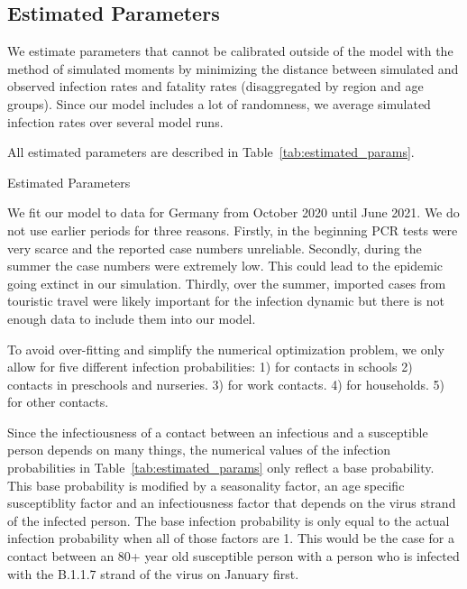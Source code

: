 \subsection{Estimated Parameters}
\label{subsec:estimated_params}


\FloatBarrier

We estimate parameters that cannot be calibrated outside of the model with the
method of simulated moments \citep{McFadden1989} by minimizing the distance between
simulated and observed infection rates and fatality rates (disaggregated by region
and age groups). Since our model includes a lot of randomness, we
average simulated infection rates over several model runs.

All estimated parameters are described in Table~\ref{tab:estimated_params}.

\begin{table}[htb]
    \centering
    \caption{Estimated Parameters}
    \label{tab:estimated_params}
    
\end{table}

We fit our model to data for Germany from October 2020 until June 2021. We do not use
earlier periods for three reasons. Firstly, in the beginning PCR tests were very scarce
and the reported case numbers unreliable. Secondly, during the summer the case
numbers were extremely low. This could lead to the epidemic going extinct in our
simulation. Thirdly, over the summer, imported cases from touristic travel were likely
important for the infection dynamic but there is not enough data to include them into
our model.

To avoid over-fitting and simplify the numerical optimization problem, we only allow for
five different infection probabilities: 1) for contacts in schools 2) contacts in
preschools and nurseries. 3) for work contacts. 4) for households. 5) for other
contacts.

Since the infectiousness of a contact between an infectious and a susceptible
person depends on many things, the numerical values of the infection probabilities in
Table~\ref{tab:estimated_params} only reflect a base probability. This
base probability is modified by a seasonality factor, an age specific
susceptiblity factor and an infectiousness factor that depends on the virus strand
of the infected person. The base infection probability is only equal to the actual
infection probability when all of those factors are 1. This would be the
case for a contact between an 80+ year old susceptible person with a person who is
infected with the B.1.1.7 strand of the virus on January first.

